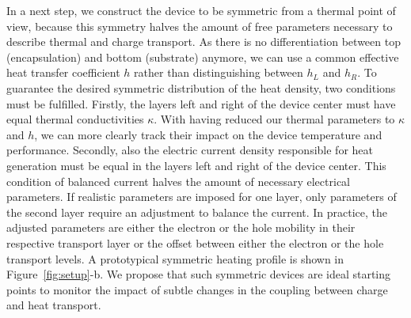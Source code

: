 \documentclass[%
9pt,
 aip,
rsi,%
 amsmath,amssymb,
preprint,%
]{revtex4-1}
\begin{document}
In a next step, we construct the device to be symmetric from a thermal point of view, because this symmetry halves the amount of free parameters necessary to describe thermal and charge transport. 
As there is no differentiation between top (encapsulation) and bottom (substrate) anymore, we can use a common effective heat transfer coefficient $h$ rather than distinguishing between $h_L$ and $h_R$.
To guarantee the desired symmetric distribution of the heat density, two conditions must be fulfilled.
Firstly, the layers left and right of the device center must have equal thermal conductivities $\kappa$.
With having reduced our thermal parameters to $\kappa$ and $h$, we can more clearly track their impact on the device temperature and performance.
Secondly, also the electric current density responsible for heat generation must be equal in the layers left and right of the device center.
This condition of balanced current halves the amount of necessary electrical parameters.
If realistic parameters are imposed for one layer, only parameters of the second layer require an adjustment to balance the current. 
In practice, the adjusted parameters are either the electron or the hole mobility in their respective transport layer or the offset between either the electron or the hole transport levels. 
A prototypical symmetric heating profile is shown in Figure~\ref{fig:setup}-b. We propose that such symmetric devices are ideal starting points to monitor the impact of subtle changes in the coupling between charge and heat transport.
\end{document}
